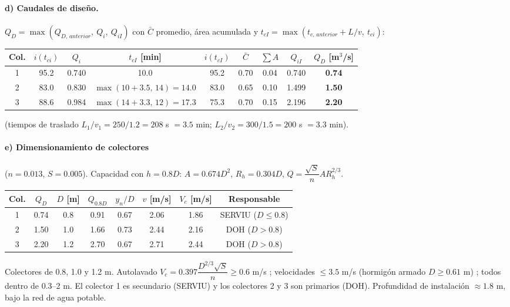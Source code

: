 \documentclass[11pt,letterpaper]{article}
\begin{document}
\paragraph{d) Caudales de diseño.} $Q_D=\max(Q_{D,\,anterior},\ Q_i,\ Q_{iI})$ con $\bar C$ promedio, área acumulada y
$t_{cI}=\max(t_{c,\,anterior}+L/v,\ t_{ci})$:
\begin{center}
\begin{tabular}{ccccccccc}
\toprule
Col. & $i(t_{ci})$ & $Q_i$ & $t_{cI}$ [min] & $i(t_{cI})$ & $\bar C$ & $\sum A$ & $Q_{iI}$ & $Q_D$ [m$^3$/s]\\
\midrule
1 & 95.2 & 0.740 & 10.0 & 95.2 & 0.70 & 0.04 & 0.740 & \textbf{0.74}\\
2 & 83.0 & 0.830 & $\max(10+3.5,\,14)=14.0$ & 83.0 & 0.65 & 0.10 & 1.499 & \textbf{1.50}\\
3 & 88.6 & 0.984 & $\max(14+3.3,\,12)=17.3$ & 75.3 & 0.70 & 0.15 & 2.196 & \textbf{2.20}\\
\bottomrule
\end{tabular}
\end{center}
(tiempos de traslado $L_1/v_1=250/1.2=208$ s $=3.5$ min; $L_2/v_2=300/1.5=200$ s $=3.3$ min).

\paragraph{e) Dimensionamiento de colectores} ($n=0.013$, $S=0.005$). Capacidad con $h=0.8D$:
$A=0.674D^2$, $R_h=0.304D$, $Q=\dfrac{\sqrt S}{n}AR_h^{2/3}$.
\begin{center}
\begin{tabular}{cccccccc}
\toprule
Col. & $Q_D$ & $D$ [m] & $Q_{0.8D}$ & $y_n/D$ & $v$ [m/s] & $V_c$ [m/s] & Responsable\\
\midrule
1 & 0.74 & 0.8 & 0.91 & 0.67 & 2.06 & 1.86 & SERVIU ($D\le0.8$)\\
2 & 1.50 & 1.0 & 1.66 & 0.73 & 2.44 & 2.16 & DOH ($D>0.8$)\\
3 & 2.20 & 1.2 & 2.70 & 0.67 & 2.71 & 2.44 & DOH ($D>0.8$)\\
\bottomrule
\end{tabular}
\end{center}
\begin{resp}Colectores de 0.8, 1.0 y 1.2 m. Autolavado $V_c=0.397\dfrac{D^{2/3}\sqrt S}{n}\ge0.6$ m/s \checkmark;
velocidades $\le3.5$ m/s (hormigón armado $D\ge0.61$ m) \checkmark; todos dentro de 0.3--2 m. El colector 1 es
secundario (SERVIU) y los colectores 2 y 3 son primarios (DOH). Profundidad de instalación $\approx1.8$ m,
bajo la red de agua potable.\end{resp}
\end{document}
